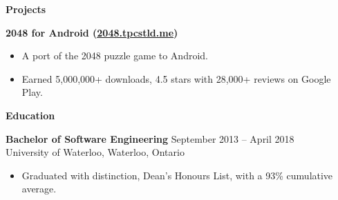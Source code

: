 \documentclass{letter}
\begin{document}
{\bfseries \Large Projects}

\vspace{-10mm}
\null\hrulefill

\vspace{-1.5mm}
{\bfseries 2048 for Android (\href{http://2048.tpcstld.me}{\uline{2048.tpcstld.me}})}
\vspace{-3mm}
\begin{itemize}
    \item A port of the 2048 puzzle game to Android.
    \item Earned 5,000,000+ downloads, 4.5 stars with 28,000+ reviews on Google
      Play.
\end{itemize}

{\bfseries \Large Education}

\vspace{-10mm}
\null\hrulefill

\vspace{-1.5mm}
{\bfseries Bachelor of Software Engineering} \hfill September 2013 -- April
2018\\
University of Waterloo, Waterloo, Ontario
\vspace{-3mm}
\begin{itemize}
    \item Graduated with distinction, Dean's Honours List, with a 93\% cumulative average.
\end{itemize}
\end{document}
